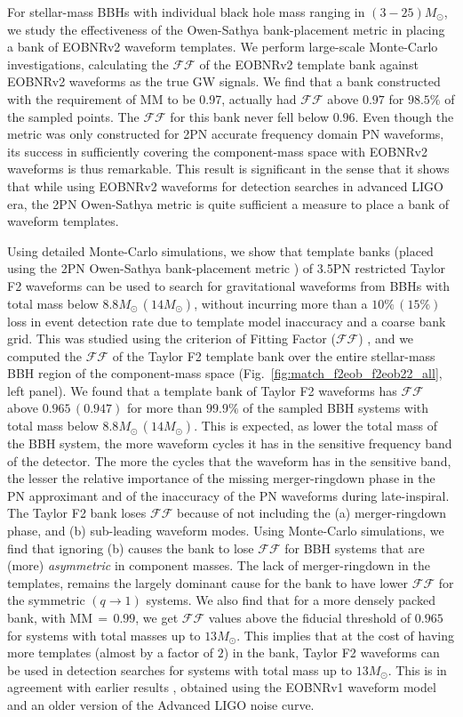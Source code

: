 \documentclass[aps,
prd,
amsmath,
amssymb,
twocolumn,
floatfix,
groupedaddress]{revtex4-1}
\newcommand{\FF}{\mathcal{FF}}
\newcommand{\MM}{\mathrm{MM}}
\begin{document}
For stellar-mass BBHs with individual black hole mass ranging in $(3-25)M_{\odot}$, we study the effectiveness of the Owen-Sathya bank-placement metric in placing a bank of EOBNRv2 waveform templates. We perform large-scale Monte-Carlo investigations, calculating the $\FF$ of the EOBNRv2 template bank against EOBNRv2 waveforms as the true GW signals. We find that a bank constructed with the requirement of $\MM$ to be 0.97, actually had $\FF$ above $0.97$ for $98.5\%$ of the sampled points. The $\FF$ for this bank never fell below $0.96$. Even though the metric was only constructed for 2PN accurate frequency domain PN waveforms, its success in sufficiently covering the component-mass space with EOBNRv2 waveforms is thus remarkable. This result is significant in the sense that it shows that while using EOBNRv2 waveforms for detection searches in advanced LIGO era, the 2PN Owen-Sathya metric is quite sufficient a measure to place a bank of waveform templates.

Using detailed Monte-Carlo simulations, we show that template banks (placed using the 2PN Owen-Sathya bank-placement metric \citep{SathyaMetric2PN}) of 3.5PN restricted Taylor F2 waveforms can be used to search for gravitational waveforms from BBHs with total mass below $8.8M_{\odot}\, (14M_{\odot})$, without incurring more than a $10\%\, (15\%)$ loss in event detection rate due to template model inaccuracy and a coarse bank grid. This was studied using the criterion of Fitting Factor ($\FF$) \citep{FittingFactorApostolatos}, and we computed the $\FF$ of the Taylor F2 template bank over the entire stellar-mass BBH region of the component-mass space (Fig.~\ref{fig:match_f2eob_f2eob22_all}, left panel). We found that a template bank of Taylor F2 waveforms has $\FF$ above $0.965\, (0.947)$ for more than $99.9\%$ of the sampled BBH systems with total mass below $8.8M_{\odot}\, (14M_{\odot})$. This is expected, as lower the total mass of the BBH system, the more waveform cycles it has in the sensitive frequency 
band of the detector. 
The more the cycles that the waveform has in the sensitive band, the lesser the relative importance of the missing merger-ringdown phase in the PN approximant and of the inaccuracy of the PN waveforms during late-inspiral. The Taylor F2 bank loses $\FF$ because of not including the (a) merger-ringdown phase, and (b) sub-leading waveform modes. Using Monte-Carlo simulations, we find that ignoring (b) causes the bank to lose $\FF$ for BBH systems that are (more) \textit{asymmetric} in component masses. The lack of merger-ringdown in the templates, remains the largely dominant cause for the bank to have lower $\FF$ for the symmetric $(q\rightarrow 1)$ systems. We also find that for a more densely packed bank, with $\MM\,=\,0.99$, we get $\FF$ values above the fiducial threshold of $0.965$ for systems with total masses up to $13M_{\odot}$. This implies that at the cost of having more templates (almost by a factor of $2$) in the bank, Taylor F2 waveforms can be used in detection searches for systems with total mass up to $13M_{\odot}$. This is in agreement with earlier results \citep{CompTemplates2009}, obtained using the EOBNRv1 waveform model \citep{Buonanno:2007pf} and an older version of the Advanced LIGO noise curve.
\end{document}
